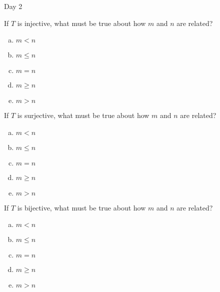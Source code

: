 \begin{applicationActivities}{Day 2}
\begin{activity}{0}
If $T$ is injective, what must be true about how $m$ and $n$ are related?
\begin{enumerate}[(a)]
\item $m<n$
\item $m \leq n$
\item $m=n$
\item $m \geq n$
\item $m>n$
\end{enumerate}
\end{activity}

\begin{activity}{0}
If $T$ is surjective, what must be true about how $m$ and $n$ are related?
\begin{enumerate}[(a)]
\item $m<n$
\item $m \leq n$
\item $m=n$
\item $m \geq n$
\item $m>n$
\end{enumerate}
\end{activity}

\begin{activity}{0}
  If $T$ is bijective, what must be true about how $m$ and $n$ are related?
\begin{enumerate}[(a)]
\item $m<n$
\item $m \leq n$
\item $m=n$
\item $m \geq n$
\item $m>n$
\end{enumerate}
\end{activity}

\end{applicationActivities}
